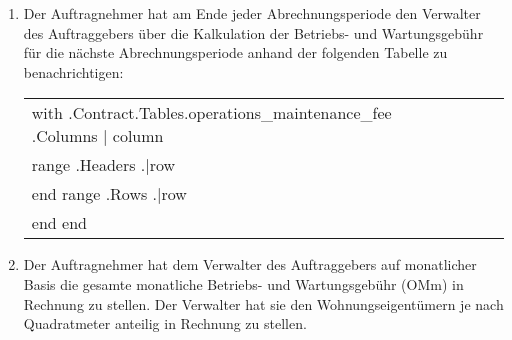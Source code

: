 \begin{enumerate}
\item{Der Auftragnehmer hat am Ende jeder Abrechnungsperiode den Verwalter des Auftraggebers über die Kalkulation der Betriebs- und Wartungsgebühr für die nächste Abrechnungsperiode anhand der folgenden Tabelle zu benachrichtigen:}


\begin{center}
\begin{tabu}{|X|X|X|X|X|X|} \tabucline{}
{{with .Contract.Tables.operations_maintenance_fee}} %
	{{.Columns | column}} \\\tabucline{}
	{{range .Headers}} {{.|row}} \\\tabucline{} {{end}} %
	{{range .Rows}} {{.|row}} \\\tabucline{} {{end}} %
{{end}}
\end{tabu}
\end{center}

\item{Der Auftragnehmer hat dem Verwalter des Auftraggebers auf monatlicher Basis die gesamte monatliche Betriebs- und Wartungsgebühr (OMm) in Rechnung zu stellen. Der Verwalter hat sie den Wohnungseigentümern je nach Quadratmeter anteilig in Rechnung zu stellen.}

\end{enumerate}
